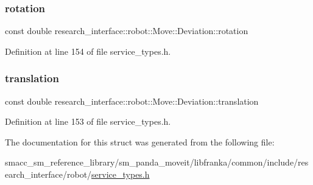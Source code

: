 \subsubsection{\texorpdfstring{rotation}{rotation}}
{\footnotesize\ttfamily const double research\+\_\+interface\+::robot\+::\+Move\+::\+Deviation\+::rotation}



Definition at line 154 of file service\+\_\+types.\+h.

\mbox{\label{structresearch__interface_1_1robot_1_1Move_1_1Deviation_a6e931e7573151ebdc78bea671357c034}} 
\subsubsection{\texorpdfstring{translation}{translation}}
{\footnotesize\ttfamily const double research\+\_\+interface\+::robot\+::\+Move\+::\+Deviation\+::translation}



Definition at line 153 of file service\+\_\+types.\+h.



The documentation for this struct was generated from the following file\+:\begin{DoxyCompactItemize}
\item 
smacc\+\_\+sm\+\_\+reference\+\_\+library/sm\+\_\+panda\+\_\+moveit/libfranka/common/include/research\+\_\+interface/robot/\hyperlink{service__types_8h}{service\+\_\+types.\+h}\end{DoxyCompactItemize}

